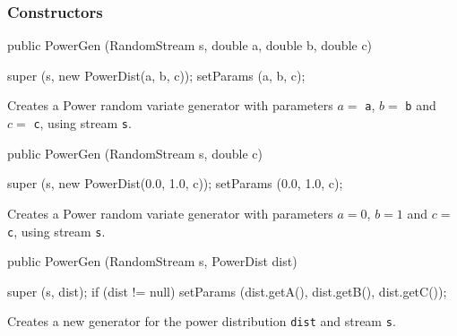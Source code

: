 \subsubsection* {Constructors}
\begin{code}

   public PowerGen (RandomStream s, double a, double b, double c) \begin{hide} {
      super (s, new PowerDist(a, b, c));
      setParams (a,  b, c);
   }\end{hide}
\end{code}
\begin{tabb} Creates a Power random variate generator with parameters
 $a =$ \texttt{a}, $b =$ \texttt{b} and $c =$ \texttt{c},
 using stream \texttt{s}.
\end{tabb}
\begin{code}

   public PowerGen (RandomStream s, double c) \begin{hide} {
      super (s, new PowerDist(0.0, 1.0, c));
      setParams (0.0, 1.0, c);
   }\end{hide}
\end{code}
\begin{tabb} Creates a Power random variate generator with parameters
 $a =0$, $b =1$ and $c =$ \texttt{c}, using stream \texttt{s}.
\end{tabb}
\begin{code}

   public PowerGen (RandomStream s, PowerDist dist) \begin{hide} {
      super (s, dist);
      if (dist != null)
         setParams (dist.getA(), dist.getB(), dist.getC());
   } \end{hide}
\end{code}
\begin{tabb} Creates a new generator for the power distribution \texttt{dist}
   and stream \texttt{s}.
\end{tabb}

